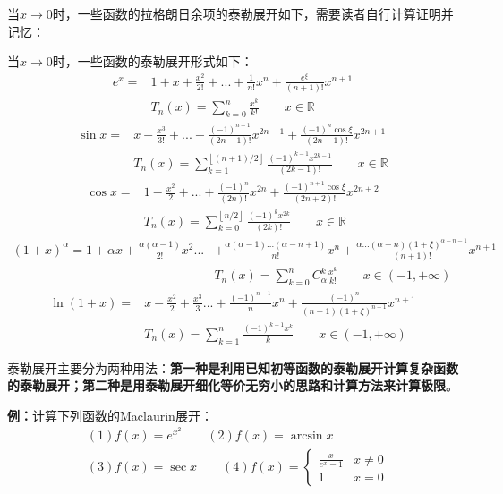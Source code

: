 \documentclass{ctexart}
\let\oldtextbf\textbf %
\renewcommand{\textbf}[1]{\textcolor{btex}{\oldtextbf{#1}}} %
\begin{document}
当$x\to 0$时，一些函数的拉格朗日余项的泰勒展开如下，需要读者自行计算证明并记忆：
\begin{tcolorbox}[
    colback=bac2,     %
    colframe=fra2,   %
    coltitle=white,             %
    coltext=tex2,
    title=常用泰勒展开,
    fonttitle=\bfseries,        %
arc=3mm,                     %
breakable
]
当$x\to 0$时，一些函数的泰勒展开形式如下：
\begin{align*}
  e^x=&1+x+\frac{x^2}{2!}+...+\frac{1}{n!}x^n+\frac{e^\xi}{(n+1)!}x^{n+1}\\&T_n(x)=\sum_{k=0}^n \frac{x^{k}}{k!}\qquad x\in\mathbb{R}\tag{3-7}   
\end{align*}
\begin{align*}
   \sin x=&x-\frac{x^3}{3!}+...+\frac{(-1)^{n-1}}{(2n-1)!}x^{2n-1}+\frac{(-1)^{n}\cos\xi}{(2n+1)!}x^{2n+1}\\&T_n(x)=\sum_{k=1}^{\left \lfloor  (n+1)/2\right \rfloor} \frac{(-1)^{k-1}x^{2k-1}}{(2k-1)!}\qquad x\in\mathbb{R}\tag{3-8}
\end{align*}
\begin{align*}
   \cos x=&1-\frac{x^2}{2}+...+\frac{(-1)^{n}}{(2n)!}x^{2n}+\frac{(-1)^{n+1}\cos\xi}{(2n+2)!}x^{2n+2}\\
&T_n(x)=\sum_{k=0}^{\left \lfloor  n/2\right \rfloor }\frac{(-1)^{k}x^{2k}}{(2k)!}\qquad x\in\mathbb{R}\tag{3-9}
\end{align*}
\begin{align*}
  (1+x)^\alpha =1+\alpha x+\frac{\alpha(\alpha-1)}{2!}x^2...&+\frac{\alpha(\alpha-1)...(\alpha-n+1)}{n!}x^{n}+\frac{\alpha...(\alpha-n)(1+\xi)^{\alpha-n-1}}{(n+1)!}x^{n+1}\\
&T_n(x)=\sum_{k=0}^nC_\alpha^k \frac{x^k}{k!} \qquad x\in(-1,+\infty)\tag{3-10}
\end{align*}
\begin{align*}
   \ln(1+x)=&x-\frac{x^2}{2}+\frac{x^3}{3}...+\frac{(-1)^{n-1}}{n}x^{n}+\frac{(-1)^{n}}{(n+1)(1+\xi)^{n+1}}x^{n+1}\\
&T_n(x)=\sum_{k=1}^n\frac{(-1)^{k-1}x^{k}}{k}\qquad x\in(-1,+\infty)\tag{3-11}
\end{align*}
\end{tcolorbox}

泰勒展开主要分为两种用法：\textbf{第一种是利用已知初等函数的泰勒展开计算复杂函数的泰勒展开；第二种是用泰勒展开细化等价无穷小的思路和计算方法来计算极限}。

\textbf{例：}计算下列函数的Maclaurin展开：
\begin{align*}
    &(1)f(x)=e^{x^2}\qquad (2)f(x)=\arcsin x\\ 
    &(3)f(x)=\sec x \qquad (4)f(x)=\begin{cases}
        \frac{x}{e^x-1}& x\neq 0\\
        1 &x=0
    \end{cases}
\end{align*}
\end{document}
